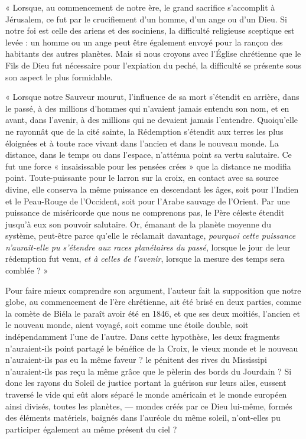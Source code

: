 \documentclass[a4paper, 11pt, oneside]{article}
\begin{document}
« Lorsque, au commencement de notre ère, le grand sacrifice s'accomplit à Jérusalem, ce fut par le crucifiement d'un homme, d'un ange ou d'un Dieu. Si notre foi est celle des ariens et des sociniens, la difficulté religieuse sceptique est levée : un homme ou un ange peut être également envoyé pour la rançon des habitants des autres planètes. Mais si nous croyons avec l'Église chrétienne que le Fils de Dieu fut nécessaire pour l'expiation du peché, la difficulté se présente sous son aspect le plus formidable.

« Lorsque notre Sauveur mourut, l'influence de sa mort s'étendit en arrière, dans le passé, à des millions d'hommes qui n'avaient jamais entendu son nom, et en avant, dans l'avenir, à des millions qui ne devaient jamais l'entendre. Quoiqu'elle ne rayonnât que de la cité sainte, la Rédemption s'étendit aux terres les plus éloignées et à toute race vivant dans l'ancien et dans le nouveau monde. La distance, dans le temps ou dans l'espace, n'atténua point sa vertu salutaire. Ce fut une force « insaisissable pour les pensées crées » que la distance ne modifia point. Toute-puissante pour le larron sur la croix, en contact avec sa source divine, elle conserva la même puissance en descendant les âges, soit pour l'Indien et le Peau-Rouge de l'Occident, soit pour l'Arabe sauvage de l'Orient. Par une puissance de miséricorde que nous ne comprenons pas, le Père céleste étendit jusqu'à eux son pouvoir salutaire. Or, émanant de la planète moyenne du système, peut-être parce qu'elle le réclamait davantage, \emph{pourquoi cette puissance n'aurait-elle pu s'étendre aux races planétaires du passé}, lorsque le jour de leur rédemption fut venu, \emph{et à celles de l'avenir}, lorsque la mesure des temps sera comblée ? »

Pour faire mieux comprendre son argument, l'auteur fait la supposition que notre globe, au commencement de l'ère chrétienne, ait été brisé en deux parties, comme la comète de Biéla le paraît avoir été en 1846, et que ses deux moitiés, l'ancien et le nouveau monde, aient voyagé, soit comme une étoile double, soit indépendamment l'une de l'autre. Dans cette hypothèse, les deux fragments n'auraient-ils point partagé le bénéfice de la Croix, le vieux monde et le nouveau n'auraient-ils pas eu la même faveur ? le pénitent des rives du Mississipi n'auraient-ils pas reçu la même grâce que le pèlerin des bords du Jourdain ? Si donc les rayons du Soleil de justice portant la guérison sur leurs ailes, eussent traversé le vide qui eût alors séparé le monde américain et le monde européen ainsi divisés, toutes les planètes, --- mondes créés par ce Dieu lui-même, formés des éléments matériels, baignés dans l'auréole du même soleil, n'ont-elles pu participer également au même présent du ciel ?
\end{document}
